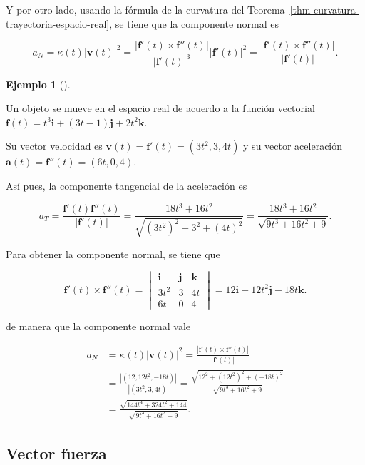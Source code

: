 \documentclass[
  a4paper,
]{scrreport}
\theoremstyle{definition}
\theoremstyle{plain}
\theoremstyle{plain}
\theoremstyle{definition}
\theoremstyle{definition}
\newtheorem{example}{Ejemplo}[chapter]
\theoremstyle{plain}
\theoremstyle{remark}
\begin{document}
Y por otro lado, usando la fórmula de la curvatura del
Teorema~\ref{thm-curvatura-trayectoria-espacio-real}, se tiene que la
componente normal es

\[
a_N 
= \kappa(t)|\mathbf{v}(t)|^2 
= \frac{|\mathbf{f}'(t)\times \mathbf{f}''(t)|}{|\mathbf{f}'(t)|^3}|\mathbf{f}'(t)|^2
= \frac{|\mathbf{f}'(t)\times \mathbf{f}''(t)|}{|\mathbf{f}'(t)|}.
\]

\begin{example}[]\protect\hypertarget{exm-componente-tangencial-normal-trayectoria}{}\label{exm-componente-tangencial-normal-trayectoria}

Un objeto se mueve en el espacio real de acuerdo a la función vectorial
\(\mathbf{f}(t) = t^3\mathbf{i} + (3t-1)\mathbf{j} + 2t^2 \mathbf{k}\).

Su vector velocidad es \(\mathbf{v}(t)=\mathbf{f}'(t) = (3t^2, 3, 4t)\)
y su vector aceleración \(\mathbf{a}(t) = \mathbf{f}''(t)=(6t, 0, 4)\).

Así pues, la componente tangencial de la aceleración es

\[
a_T
= \frac{\mathbf{f}'(t)\mathbf{f}''(t)}{|\mathbf{f}'(t)|}
= \frac{18t^3+16t^2}{\sqrt{(3t^2)^2 + 3^2 + (4t)^2}}
= \frac{18t^3+16t^2}{\sqrt{9t^3+16t^2+9}}.
\]

Para obtener la componente normal, se tiene que

\[
\mathbf{f}'(t)\times \mathbf{f}''(t)
=
\begin{vmatrix}
\mathbf{i} & \mathbf{j} &\mathbf{k}\\
3t^2 & 3 & 4t \\
6t & 0 & 4
\end{vmatrix}
= 12\mathbf{i}+12t^2\mathbf{j}-18t\mathbf{k}.
\]

de manera que la componente normal vale

\begin{align*}
a_N 
&= \kappa(t)|\mathbf{v}(t)|^2 
= \frac{|\mathbf{f}'(t)\times \mathbf{f}''(t)|}{|\mathbf{f}'(t)|} \\
&= \frac{|(12, 12t^2, -18t)|}{|(3t^2,3,4t)|}
= \frac{\sqrt{12^2+(12t^2)^2+(-18t)^2}}{\sqrt{9t^3+16t^2+9}} \\
&= \frac{\sqrt{144t^4+324t^2+144}}{\sqrt{9t^3+16t^2+9}}.
\end{align*}

\end{example}

\hypertarget{vector-fuerza}{%
\subsection{Vector fuerza}\label{vector-fuerza}}
\end{document}
